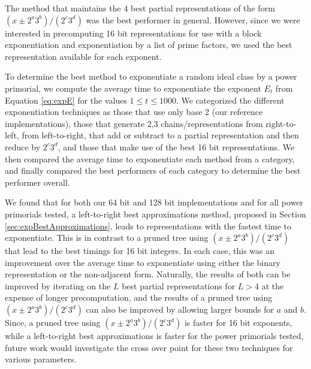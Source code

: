 \documentclass{ucalgthes1}
\theoremstyle{definition}
\begin{document}
The method that maintains the 4 best partial representations of the form $(x \pm 2^a3^b)/(2^c3^d)$ was the best performer in general.  However, since we were interested in precomputing 16 bit representations for use with a block exponentiation and exponentiation by a list of prime factors, we used the best representation available for each exponent.

To determine the best method to exponentiate a random ideal class by a power primorial, we compute the average time to exponentiate the exponent $E_t$ from Equation \ref{eq:expE} for the values $1 \le t \le 1000$.  We categorized the different exponentiation techniques as those that use only base 2 (our reference implementations), those that generate 2,3 chains/representations from right-to-left, from left-to-right, that add or subtract to a partial representation and then reduce by $2^c3^d$, and those that make use of the best 16 bit representations.  We then compared the average time to exponentiate each method from a category, and finally compared the best performers of each category to determine the best performer overall.

We found that for both our 64 bit and 128 bit implementations and for all power primorials tested, a left-to-right best approximations method, proposed in Section \ref{sec:expBestApproximations}, leads to representations with the fastest time to exponentiate.  This is in contrast to a pruned tree using $(x \pm 2^a3^b)/(2^c3^d)$ that lead to the best timings for 16 bit integers.  In each case, this was an improvement over the average time to exponentiate using either the binary representation or the non-adjacent form.  Naturally, the results of both can be improved by iterating on the $L$ best partial representations for $L > 4$ at the expense of longer precomputation, and the results of a pruned tree using $(x \pm 2^a3^b)/(2^c3^d)$ can also be improved by allowing larger bounds for $a$ and $b$.  Since, a pruned tree using $(x \pm 2^a3^b)/(2^c3^d)$ is faster for 16 bit exponents, while a left-to-right best approximations is faster for the power primorials tested, future work would investigate the cross over point for these two techniques for various parameters.
\end{document}
